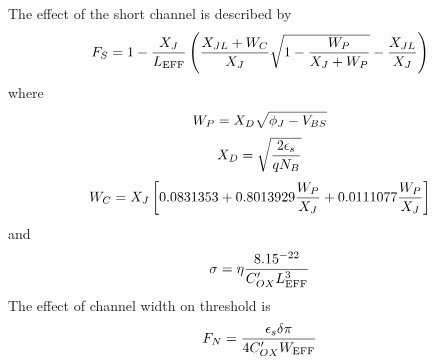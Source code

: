 The effect of the short channel is described by
\begin{equation}
F_S = 1 - {X_J\over{L_{\mbox{\scriptsize EFF}}}} \left(
      {{X_{JL} + W_C}\over{X_J}} 
      \sqrt{1 - {{W_P\over{X_J+ W_P}}}} - {{X_{JL}}\over X_J}\right)
\end{equation}
where
\begin{equation}
W_P = X_D\sqrt{\phi_J-V_{BS}}
\end{equation}
\begin{equation}
X_D = \sqrt{{2 \epsilon_s}\over q N_B}
\label{m3:xd:eqn}
\end{equation}
\begin{equation}
W_C = X_J \left[ 0.0831353 + 0.8013929{{W_P}\over{X_J}}
      +0.0111077{{W_P}\over{X_J}} \right]
\end{equation}
and
\begin{equation}
\sigma = \ETA{{8.15 \time 10^{-22}}\over{C'_{OX}L_{\ms{EFF}}^3}}
\label{eqn:m:sigma:l3}
\end{equation}
The effect of channel width on threshold is
\begin{equation}
F_N = {{\textstyle\epsilon_s\delta\pi} \over {\textstyle 4 C'_{OX}W_{\mbox{\scriptsize EFF}}}}
\end{equation}

